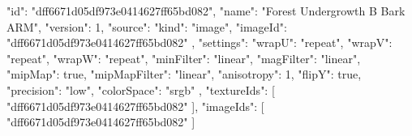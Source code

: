 {
  "id": "dff6671d05df973e0414627ff65bd082",
  "name": "Forest Undergrowth B Bark ARM",
  "version": 1,
  "source": {
    "kind": "image",
    "imageId": "dff6671d05df973e0414627ff65bd082"
  },
  "settings": {
    "wrapU": "repeat",
    "wrapV": "repeat",
    "wrapW": "repeat",
    "minFilter": "linear",
    "magFilter": "linear",
    "mipMap": true,
    "mipMapFilter": "linear",
    "anisotropy": 1,
    "flipY": true,
    "precision": "low",
    "colorSpace": "srgb"
  },
  "textureIds": [
    "dff6671d05df973e0414627ff65bd082"
  ],
  "imageIds": [
    "dff6671d05df973e0414627ff65bd082"
  ]
}
